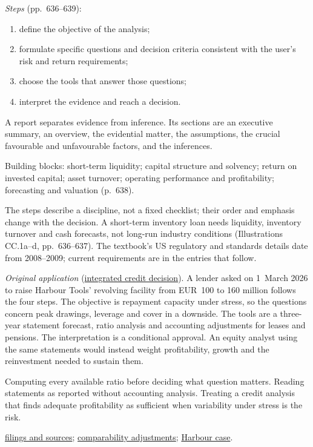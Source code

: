 \begin{qfdefinition}
\emph{Steps} (pp.~636--639):
\begin{enumerate}
\item define the objective of the analysis;
\item formulate specific questions and decision criteria consistent with the user's risk and return requirements;
\item choose the tools that answer those questions;
\item interpret the evidence and reach a decision.
\end{enumerate}
A report separates evidence from inference. Its sections are an executive summary, an overview, the evidential matter, the assumptions, the crucial favourable and unfavourable factors, and the inferences.

 Building blocks: short-term liquidity; capital structure and solvency; return on invested capital; asset turnover; operating performance and profitability; forecasting and valuation (p.~638).

 The steps describe a discipline, not a fixed checklist; their order and emphasis change with the decision. A short-term inventory loan needs liquidity, inventory turnover and cash forecasts, not long-run industry conditions (Illustrations CC.1a--d, pp.~636--637). The textbook's US regulatory and standards details date from 2008--2009; current requirements are in the entries that follow.

 \emph{Original application} (\hyperref[ex:integrated-credit-decision]{integrated credit decision}). A lender asked on 1~March 2026 to raise Harbour Tools' revolving facility from EUR~100 to 160 million follows the four steps. The objective is repayment capacity under stress, so the questions concern peak drawings, leverage and cover in a downside. The tools are a three-year statement forecast, ratio analysis and accounting adjustments for leases and pensions. The interpretation is a conditional approval. An equity analyst using the same statements would instead weight profitability, growth and the reinvestment needed to sustain them.

 Computing every available ratio before deciding what question matters. Reading statements as reported without accounting analysis. Treating a credit analysis that finds adequate profitability as sufficient when variability under stress is the risk.

 \hyperref[def:filings-disclosures-information-sources]{filings and sources}; \hyperref[meth:accounting-analysis-adjustments]{comparability adjustments}; \hyperref[ex:harbour-tools-statements]{Harbour case}.

\end{qfdefinition}

